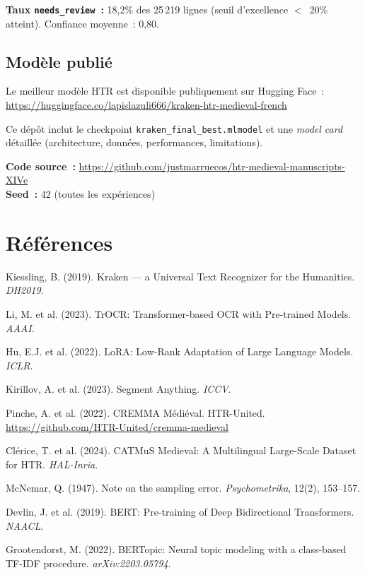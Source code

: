 \documentclass[11pt,a4paper]{article}
\begin{document}
\noindent\textbf{Taux \texttt{needs\_review}~:} 18,2\% des 25\,219 lignes (seuil d'excellence $<$~20\% atteint). Confiance moyenne~: 0,80.

\subsection{Modèle publié}

Le meilleur modèle HTR est disponible publiquement sur Hugging Face~:\\
\url{https://huggingface.co/lapislazuli666/kraken-htr-medieval-french}

\noindent Ce dépôt inclut le checkpoint \texttt{kraken\_final\_best.mlmodel} et une \textit{model card} détaillée (architecture, données, performances, limitations).

\vspace{0.5cm}
\noindent\textbf{Code source~:} \url{https://github.com/justmarruecos/htr-medieval-manuscripts-XIVe}\\
\textbf{Seed~:} 42 (toutes les expériences)

\section*{Références}

\begin{enumerate}[leftmargin=*, label={[\arabic*]}, itemsep=2pt, font=\small]
\item \label{kiessling2019} Kiessling, B. (2019). Kraken --- a Universal Text Recognizer for the Humanities. \textit{DH2019}.
\item \label{li2023} Li, M. et al. (2023). TrOCR: Transformer-based OCR with Pre-trained Models. \textit{AAAI}.
\item \label{hu2022} Hu, E.J. et al. (2022). LoRA: Low-Rank Adaptation of Large Language Models. \textit{ICLR}.
\item \label{kirillov2023} Kirillov, A. et al. (2023). Segment Anything. \textit{ICCV}.
\item Pinche, A. et al. (2022). CREMMA Médiéval. HTR-United. \url{https://github.com/HTR-United/cremma-medieval}
\item Clérice, T. et al. (2024). CATMuS Medieval: A Multilingual Large-Scale Dataset for HTR. \textit{HAL-Inria}.
\item McNemar, Q. (1947). Note on the sampling error. \textit{Psychometrika}, 12(2), 153--157.
\item Devlin, J. et al. (2019). BERT: Pre-training of Deep Bidirectional Transformers. \textit{NAACL}.
\item Grootendorst, M. (2022). BERTopic: Neural topic modeling with a class-based TF-IDF procedure. \textit{arXiv:2203.05794}.
\end{enumerate}
\end{document}
